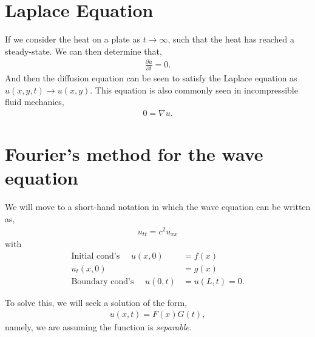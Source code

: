 \documentclass[11pt,a4paper]{report}
\theoremstyle{definition}
\begin{document}
\section{Laplace Equation}
If we consider the heat on a plate as $t\rightarrow \infty$, such that the heat has reached a steady-state. We can then determine that, 
\begin{align*}
	\frac{\partial u}{\partial t} = 0.
\end{align*}
And then the diffusion equation can be seen to satisfy the Laplace equation as $u(x,y,t)\rightarrow u(x,y)$. This equation is also commonly seen in incompressible fluid mechanics,
\begin{align*}
0 = \nabla u.
\end{align*}


\section{Fourier's method for the wave equation}
We will move to a short-hand notation in which the wave equation can be written as,
\begin{align*}
	u_{tt} = c^2 u_{xx}
\end{align*}
with
\begin{align*}
	\text{Initial cond's } \quad u(x,0) &= f(x) \\
						   u_t(x,0) &= g(x) \\
	\text{Boundary cond's } \quad u(0,t) &= u(L,t) = 0.
\end{align*}

To solve this, we will seek a solution of the form,
\begin{align*}
	u(x,t) = F(x) G(t),
\end{align*}
namely, we are assuming the function is \textit{separable}.
\end{document}
